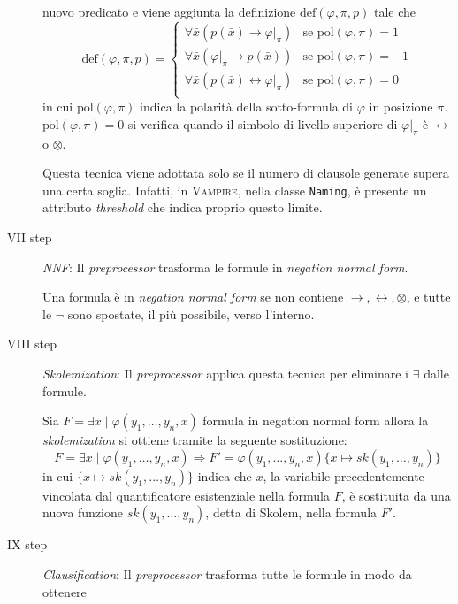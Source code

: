 \begin{description}
\begin{definition}
        nuovo predicato e viene aggiunta la definizione $\text{def}(\varphi,\pi,p)$ tale che
        \[\text{def}(\varphi,\pi,p)=\begin{cases}
            \forall \bar{x} (p(\bar{x})\rightarrow \varphi|_\pi) & \text{se pol}(\varphi,\pi)=1\\
            \forall \bar{x} (\varphi|_\pi\rightarrow p(\bar{x})) & \text{se pol}(\varphi,\pi)=-1\\
            \forall \bar{x} (p(\bar{x})\leftrightarrow \varphi|_\pi) & \text{se pol}(\varphi,\pi)=0\\
        \end{cases}\]
        in cui $\text{pol}(\varphi,\pi)$ indica la polarità della sotto-formula di $\varphi$ in posizione $\pi$. $\text{pol}(\varphi,\pi)=0$ si verifica quando il simbolo di livello superiore di $\varphi|_\pi$ è 
        $\leftrightarrow$ o $\otimes$.   
    \end{definition}
    Questa tecnica viene adottata solo se il numero di clausole generate supera una certa soglia. Infatti, in 
    \textsc{Vampire}, nella classe \verb|Naming|, è presente un attributo \emph{threshold} che indica proprio questo limite.
    \item[VII step] \emph{NNF}: Il \emph{preprocessor} trasforma le formule in \emph{negation normal form}.
    \begin{definition}
        Una formula è in \emph{negation normal form} se non contiene $\rightarrow,\leftrightarrow,\otimes$, e tutte le $\neg$ sono spostate, il più possibile, verso l'interno.
    \end{definition}
    \item[VIII step] \emph{Skolemization}: Il \emph{preprocessor} applica questa tecnica per eliminare i $\exists$ dalle formule.
    \begin{definition}
        Sia $F=\exists x\mid\varphi(y_1,\dots,y_n,x)$ formula in negation normal form allora la \emph{skolemization} si ottiene tramite la seguente sostituzione:
        \[F=\exists x\mid\varphi(y_1,\dots,y_n,x)\Rightarrow F'=\varphi(y_1,\dots,y_n,x)\{x \mapsto sk(y_1,\dots,y_n)\}\]
        in cui $\{x \mapsto sk(y_1,\dots,y_n)\}$ indica che $x$, la variabile precedentemente vincolata dal quantificatore esistenziale nella formula $F$, 
        è sostituita da una nuova funzione $sk(y_1,\dots,y_n)$, detta di Skolem, nella formula $F'$.
    \end{definition}
    \item[IX step] \emph{Clausification}: Il \emph{preprocessor} trasforma tutte le formule in modo da ottenere 

\end{description}
